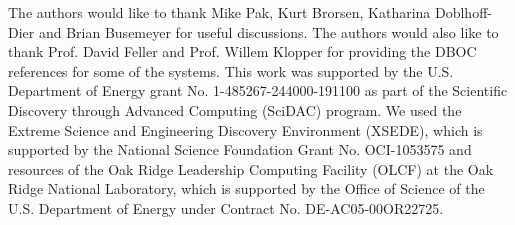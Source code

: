 The authors would like to thank Mike Pak, Kurt Brorsen, Katharina Doblhoff-Dier and Brian Busemeyer for useful discussions. The authors would also like to thank Prof. David Feller and Prof. Willem Klopper for providing the DBOC references for some of the systems. This work was supported by the U.S. Department of Energy grant No. 1-485267-244000-191100 as part of the Scientific Discovery through Advanced Computing (SciDAC) program. We used the Extreme Science and Engineering Discovery Environment (XSEDE), which is supported by the National Science Foundation Grant No. OCI-1053575 and resources of the Oak Ridge Leadership Computing Facility (OLCF) at the Oak Ridge National Laboratory, which is supported by the Office of Science of the U.S. Department of Energy under Contract No. DE-AC05-00OR22725.